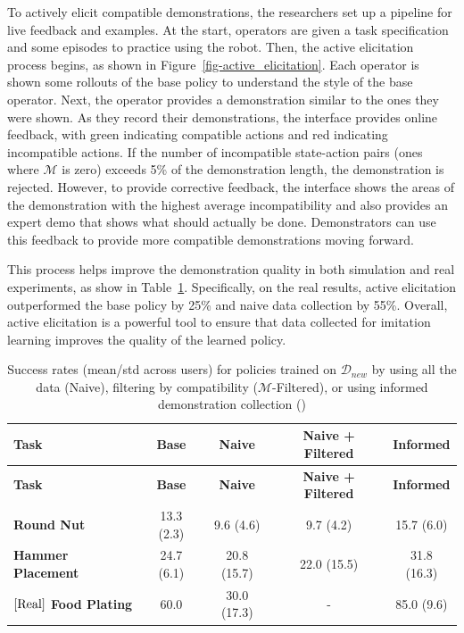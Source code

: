 \documentclass[
  letterpaper,
  numbers=noenddot,
  DIV=11]{scrreprt}
\theoremstyle{plain}
\theoremstyle{definition}
\theoremstyle{plain}
\theoremstyle{remark}
\begin{document}
To actively elicit compatible demonstrations, the researchers set up a
pipeline for live feedback and examples. At the start, operators are
given a task specification and some episodes to practice using the
robot. Then, the active elicitation process begins, as shown in
Figure~\ref{fig-active_elicitation}. Each operator is shown some
rollouts of the base policy to understand the style of the base
operator. Next, the operator provides a demonstration similar to the
ones they were shown. As they record their demonstrations, the interface
provides online feedback, with green indicating compatible actions and
red indicating incompatible actions. If the number of incompatible
state-action pairs (ones where \(\mathcal{M}\) is zero) exceeds 5\% of
the demonstration length, the demonstration is rejected. However, to
provide corrective feedback, the interface shows the areas of the
demonstration with the highest average incompatibility and also provides
an expert demo that shows what should actually be done. Demonstrators
can use this feedback to provide more compatible demonstrations moving
forward.

This process helps improve the demonstration quality in both simulation
and real experiments, as show in
Table~\ref{tbl-active_elicitation_results}. Specifically, on the real
results, active elicitation outperformed the base policy by 25\% and
naive data collection by 55\%. Overall, active elicitation is a powerful
tool to ensure that data collected for imitation learning improves the
quality of the learned policy.

\begin{longtable}[]{@{}lcccc@{}}
\caption{Success rates (mean/std across users) for policies trained on
\(\mathcal{D}_{new}\) by using all the data (Naive), filtering by
compatibility (\(\mathcal{M}\)-Filtered), or using informed
demonstration collection ()}\label{tbl-active_elicitation_results}\tabularnewline
\toprule\noalign{}
\textbf{Task} & \textbf{Base} & \textbf{Naive} & \textbf{Naive +
Filtered} & \textbf{Informed} \\
\midrule\noalign{}
\endfirsthead
\toprule\noalign{}
\textbf{Task} & \textbf{Base} & \textbf{Naive} & \textbf{Naive +
Filtered} & \textbf{Informed} \\
\midrule\noalign{}
\endhead
\bottomrule\noalign{}
\endlastfoot
\textbf{Round Nut} & 13.3 (2.3) & 9.6 (4.6) & 9.7 (4.2) & 15.7 (6.0) \\
\textbf{Hammer Placement} & 24.7 (6.1) & 20.8 (15.7) & 22.0 (15.5) &
31.8 (16.3) \\
\textbf{\(\left[ \textup{Real} \right]\) Food Plating} & 60.0 & 30.0
(17.3) & - & 85.0 (9.6) \\
\end{longtable}
\end{document}
